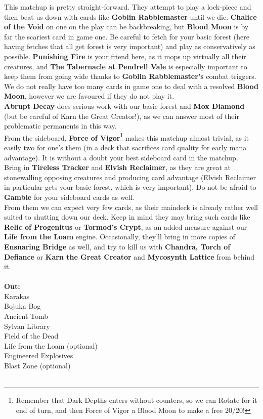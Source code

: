 \documentclass{report}
\begin{document}
This matchup is pretty straight-forward. They attempt to play a lock-piece and then beat us down with cards like \textbf{Goblin Rabblemaster} until we die. \textbf{Chalice of the Void} on one on the play can be backbreaking, but \textbf{Blood Moon} is by far the scariest card in game one. Be careful to fetch for your basic forest (here having fetches that all get forest is very important) and play as conservatively as possible. \textbf{Punishing Fire} is your friend here, as it mops up virtually all their creatures, and \textbf{The Tabernacle at Pendrell Vale} is especially important to keep them from going wide thanks to \textbf{Goblin Rabblemaster's} combat triggers.\\ We do not really have too many cards in game one to deal with a resolved \textbf{Blood Moon}, however we are favoured if they do not play it.\\ \textbf{Abrupt Decay} does serious work with our basic forest and \textbf{Mox Diamond} (but be careful of Karn the Great Creator!), as we can answer most of their problematic permanents in this way.\\From the sideboard, \textbf{Force of Vigor}\footnote{Remember that Dark Depths enters without counters, so we can Rotate for it end of turn, and then Force of Vigor a Blood Moon to make a free 20/20!} makes this matchup almost trivial, as it easily two for one's them (in a deck that sacrifices card quality for early mana advantage). It is without a doubt your best sideboard card in the matchup.\\ Bring in \textbf{Tireless Tracker} and \textbf{Elvish Reclaimer}, as they are great at stonewalling opposing creatures and producing card advantage (Elvish Reclaimer in particular gets your basic forest, which is very important). Do not be afraid to \textbf{Gamble} for your sideboard cards as well.\\From them we can expect very few cards, as their maindeck is already rather well suited to shutting down our deck. Keep in mind they may bring such cards like \textbf{Relic of Progenitus} or \textbf{Tormod's Crypt}, as an added measure against our \textbf{Life from the Loam} engine. Occasionally, they'll bring in more copies of \textbf{Ensnaring Bridge} as well, and try to kill us with \textbf{Chandra, Torch of Defiance} or \textbf{Karn the Great Creator} and \textbf{Mycosynth Lattice} from behind it.\\\\
\textbf{Out:}\\
Karakas\\Bojuka Bog\\Ancient Tomb\\Sylvan Library\\Field of the Dead\\Life from the Loam (optional)\\Engineered Explosives\\Blast Zone (optional)\\\\
\end{document}
